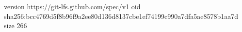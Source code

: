 version https://git-lfs.github.com/spec/v1
oid sha256:bcc4769d5f8b96f9a2ee80d136d8137cbe1ef74199c990a7dfa5ae8578b1aa7d
size 266
